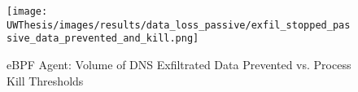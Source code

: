 \documentclass [11pt, proquest] {uwthesis}[2020/02/24]
\begin{document}
\begin{figure}[H]
  \centering
  \texttt{[image: UWThesis/images/results/data\_loss\_passive/exfil\_stopped\_passive\_data\_prevented\_and\_kill.png]}
\caption{eBPF Agent: Volume of DNS Exfiltrated Data Prevented vs. Process Kill Thresholds}
  \label{fig:data_loss_prev}
\end{figure}

\end{document}
